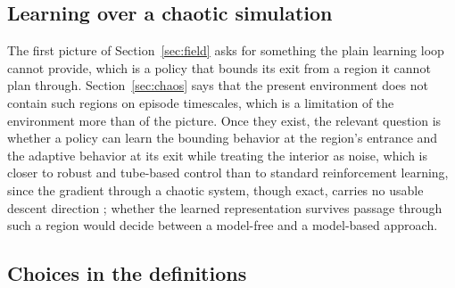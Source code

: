 \documentclass[11pt]{article}
\begin{document}
\subsection{Learning over a chaotic simulation}

The first picture of Section~\ref{sec:field} asks for something the plain
learning loop cannot provide, which is a policy that bounds its exit from a
region it cannot plan through. Section~\ref{sec:chaos} says that the present
environment does not contain such regions on episode timescales, which is a
limitation of the environment more than of the picture. Once they exist, the relevant question is whether a policy can learn the
bounding behavior at the region's entrance and the adaptive behavior at its
exit while treating the interior as noise, which is closer to robust and
tube-based control \cite{mayne2005,mitchell2005} than to standard
reinforcement learning, since the gradient through a chaotic system, though
exact, carries no usable descent direction
\cite{metz2021,parmas2018,suh2022}; whether
the learned representation survives passage through such a region would
decide between a model-free and a model-based approach.

\subsection{Choices in the definitions}
\label{sec:choices}
\end{document}
